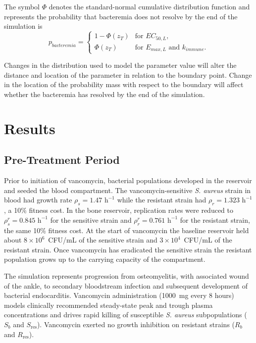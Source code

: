 \documentclass[journal]{IEEEtran}
\begin{document}
The symbol $\Phi$ denotes the standard-normal cumulative distribution function and represents the
probability that bacteremia does not resolve by the end of the simulation is
\begin{equation}
p_{bacteremia}=
\begin{cases}
1-\Phi(z_T) & \text{for } EC_{50,L},\\
\Phi(z_T) & \text{for } E_{max,L}\text{ and }k_{immune}.
\end{cases}
\label{eq:lognormal-bacteremia-tail}
\end{equation}

Changes in the distribution used to model the parameter value will alter the distance and location of the parameter in relation to the boundary point.  Change in the location of the probability mass with respect to the boundary will affect whether the bacteremia has resolved by the end of the simulation.

\section{Results}

\subsection{Pre-Treatment Period}
Prior to initiation of vancomycin, bacterial populations developed in the reservoir and seeded the blood compartment. The vancomycin-sensitive \textit{S. aureus} strain in blood had growth rate $\rho_s = 1.47\text{ h}^{-1}$ while the resistant strain had $\rho_r = 1.323\text{ h}^{-1}$, a 10\% fitness cost. In the bone reservoir, replication rates were reduced to $\rho_s^r = 0.845\text{ h}^{-1}$ for the sensitive strain and $\rho_r^r = 0.761\text{ h}^{-1}$ for the resistant strain, the same 10\% fitness cost.
At the start of vancomycin the baseline reservoir held about $8\times10^{6}$~CFU/mL of the
sensitive strain and $3\times10^{4}$~CFU/mL of the resistant strain.
Once vancomycin has eradicated the sensitive strain the resistant population grows up to the carrying capacity of the compartment.

The simulation represents progression from osteomyelitis, with associated wound of the ankle, to secondary bloodstream infection and subsequent development of bacterial endocarditis. Vancomycin administration (1000~mg every 8 hours) models clinically recommended steady-state peak and trough plasma concentrations and drives rapid killing of susceptible \textit{S. aureus} subpopulations ($S_b$ and $S_{\text{res}}$). Vancomycin exerted no growth inhibition on resistant strains ($R_b$ and $R_{\text{res}}$).
\end{document}
